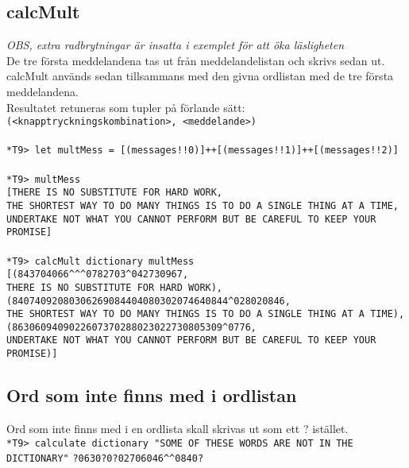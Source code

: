 \documentclass[a4paper]{article}
\def\code#1{\texttt{#1}}
\begin{document}
\subsection{calcMult}
\textit{OBS, extra radbrytningar är insatta i exemplet för att öka läsligheten}\\
De tre första meddelandena tas ut från meddelandelistan och skrivs sedan ut.\\
calcMult används sedan tillsammans med den givna ordlistan med de tre första meddelandena.\\
Resultatet retuneras som tupler på förlande sätt: \\ 
\code{(<knapptryckningskombination>, <meddelande>)} \\ \\
\code{*T9> let multMess = [(messages!!0)]++[(messages!!1)]++[(messages!!2)]}\\ \\ 
\code{*T9> multMess}\\
\code{[THERE IS NO SUBSTITUTE FOR HARD WORK,}\\
\code{THE SHORTEST WAY TO DO MANY THINGS IS TO DO A SINGLE THING AT A TIME,}\\
\code{UNDERTAKE NOT WHAT YOU CANNOT PERFORM BUT BE CAREFUL TO KEEP YOUR PROMISE]}\\ \\
\code{*T9> calcMult dictionary multMess }\\
\code{[(843704066\^{}\^{}\^{}0782703\^{}042730967,}\\
\code{THERE IS NO SUBSTITUTE FOR HARD WORK),}\\
\code{(84074092080306269084404080302074640844\^{}028020846,}\\
\code{THE SHORTEST WAY TO DO MANY THINGS IS TO DO A SINGLE THING AT A TIME),}\\
\code{(8630609409022607370288023022730805309\^{}0776,}\\
\code{UNDERTAKE NOT WHAT YOU CANNOT PERFORM BUT BE CAREFUL TO KEEP YOUR PROMISE)]}\\

\subsection{Ord som inte finns med i ordlistan}
Ord som inte finns med i en ordlista skall skrivas ut som ett ? istället.\\
\code{*T9> calculate dictionary "SOME OF THESE WORDS ARE NOT IN THE DICTIONARY"}
\code{?0630?0?02706046\^{}\^{}0840?}
\end{document}
